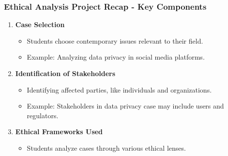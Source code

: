 \documentclass[aspectratio=169]{beamer}
\begin{document}
\begin{frame}[fragile]
    \frametitle{Ethical Analysis Project Recap - Key Components}
    \begin{enumerate}
        \item \textbf{Case Selection}
            \begin{itemize}
                \item Students choose contemporary issues relevant to their field.
                \item Example: Analyzing data privacy in social media platforms.
            \end{itemize}
        \item \textbf{Identification of Stakeholders}
            \begin{itemize}
                \item Identifying affected parties, like individuals and organizations.
                \item Example: Stakeholders in data privacy case may include users and regulators.
            \end{itemize}
        \item \textbf{Ethical Frameworks Used}
            \begin{itemize}
                \item Students analyze cases through various ethical lenses.
            \end{itemize}
    \end{enumerate}
\end{frame}
\end{document}
